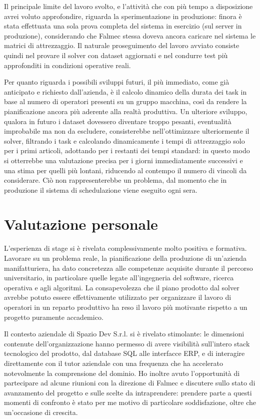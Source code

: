 Il principale limite del lavoro svolto, e l'attività che con più tempo a disposizione avrei voluto approfondire, riguarda la sperimentazione in produzione: finora è stata effettuata una sola prova completa del sistema in esercizio (sul server in produzione), considerando che Falmec stessa doveva ancora caricare nel sistema le matrici di attrezzaggio. Il naturale proseguimento del lavoro avviato consiste quindi nel provare il solver con dataset aggiornati e nel condurre test più approfonditi in condizioni operative reali.

Per quanto riguarda i possibili sviluppi futuri, il più immediato, come già anticipato e richiesto dall'azienda, è il calcolo dinamico della durata dei task in base al numero di operatori presenti su un gruppo macchina, così da rendere la pianificazione ancora più aderente alla realtà produttiva. Un ulteriore sviluppo, qualora in futuro i dataset dovessero diventare troppo pesanti, eventualità improbabile ma non da escludere, consisterebbe nell'ottimizzare ulteriormente il solver, filtrando i task e calcolando dinamicamente i tempi di attrezzaggio solo per i primi articoli, adottando per i restanti dei tempi standard: in questo modo si otterrebbe una valutazione precisa per i giorni immediatamente successivi e una stima per quelli più lontani, riducendo al contempo il numero di vincoli da considerare. Ciò non rappresenterebbe un problema, dal momento che in produzione il sistema di schedulazione viene eseguito ogni sera.

\section{Valutazione personale}
\label{sec:valutazione}

L'esperienza di stage si è rivelata complessivamente molto positiva e formativa. Lavorare su un problema reale, la pianificazione della produzione di un'azienda manifatturiera, ha dato concretezza alle competenze acquisite durante il percorso universitario, in particolare quelle legate all'ingegneria del software, ricerca operativa e agli algoritmi. La consapevolezza che il piano prodotto dal solver avrebbe potuto essere effettivamente utilizzato per organizzare il lavoro di operatori in un reparto produttivo ha reso il lavoro più motivante rispetto a un progetto puramente accademico.

Il contesto aziendale di Spazio Dev S.r.l. si è rivelato stimolante: le dimensioni contenute dell'organizzazione hanno permesso di avere visibilità sull'intero stack tecnologico del prodotto, dal database SQL alle interfacce ERP, e di interagire direttamente con il tutor aziendale con una frequenza che ha accelerato notevolmente la comprensione del dominio. Ho inoltre avuto l'opportunità di partecipare ad alcune riunioni con la direzione di Falmec e discutere sullo stato di avanzamento del progetto e sulle scelte da intraprendere: prendere parte a questi momenti di confronto è stato per me motivo di particolare soddisfazione, oltre che un'occasione di crescita.

